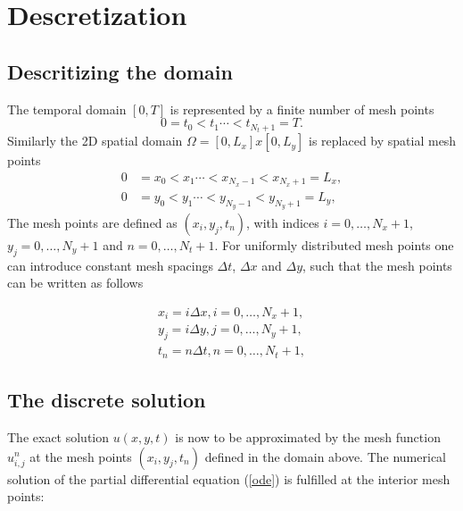 \documentclass[twoside]{article}
\begin{document}
\section{Descretization}
\label{descretization}
  

\subsection{Descritizing the domain}
\label{descritizing the domain}

The temporal domain $[0,T]$ is represented by a finite number of mesh points
\begin{equation}
 0= t_0< t_1 \cdots < t_{N_t+1}=T.
\label{eqn:tdomain}
\end{equation}
Similarly the 2D spatial domain $\Omega = [0, L_x]x[0, L_y]$ is replaced by spatial mesh points
\begin{align}
0 &= x_0< x_1 \cdots <x_{N_x-1}< x_{N_x+1}=L_x,\label{eqn:xmesh}\\
0 &= y_0< y_1 \cdots <y_{N_y-1}< y_{N_y+1}=L_y,  \label{eqn:initial2}
\end{align}
The mesh points are defined as $(x_i,y_j,t_n)$, with indices $i=0, \dots,N_x+1$, $y_j=0, \dots, N_y+1$ and $n=0, \dots, N_t+1$. For uniformly distributed mesh points one can introduce constant mesh spacings $\Delta t$, $\Delta x$ and $\Delta y$, such that the mesh points can be written as follows
 
\begin{align}
x_i=i \Delta x, i=0, \dots,N_x+1,\label{eqn:xmeshp}\\
y_j=i \Delta y, j=0, \dots,N_y+1,\label{eqn:ymeshp}\\
t_n=n \Delta t, n=0, \dots,N_t+1,\label{eqn:tmeshp}
\end{align}

\subsection{The discrete solution}
\label{the discrete solution}

The exact solution $u(x,y,t)$ is now to be approximated by the mesh function $u_{i,j}^{n}$ at the mesh points $(x_i,y_j,t_n)$ defined in the domain above. The numerical solution of the partial differential equation (\ref{ode}) is fulfilled at the interior mesh points:
\end{document}
